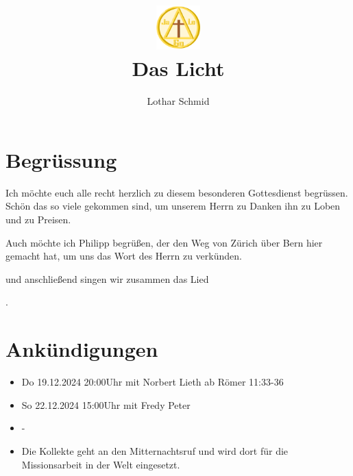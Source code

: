 \documentclass{../inc/mybib}
\title{\includegraphics[height=48pt]{assets/images/logo.png}\\Das Licht}
\author{Lothar Schmid}
\begin{document}
\maketitle
\section{Begrüssung}

Ich möchte euch alle recht herzlich zu diesem besonderen Gottesdienst begrüssen. Schön das so viele gekommen sind, um unserem Herrn zu Danken ihn zu Loben und zu Preisen.

Auch möchte ich Philipp begrüßen, der den Weg von Zürich über Bern hier gemacht hat, um uns das Wort des Herrn zu verkünden. 

\noindent
\beten{} und anschließend singen wir zusammen das Lied

\noindent
{}.

\section{Ankündigungen}
\begin{itemize}
    \item {} Do 19.12.2024 20:00Uhr mit Norbert Lieth ab Römer 11:33-36
    \item {} So 22.12.2024 15:00Uhr mit Fredy Peter
    \item {} -
    \item {} Die Kollekte geht an den Mitternachtsruf und wird dort für die Missionsarbeit in der Welt eingesetzt.
\end{itemize}
\end{document}
